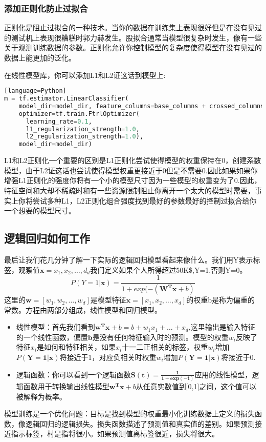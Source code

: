 \subsubsection{添加正则化防止过拟合}
正则化是阻止过拟合的一种技术。当你的数据在训练集上表现很好但是在没有见过的测试机上表现很糟糕时郭力赫发生。股拟合通常当模型很复杂时发生，像有一些关于观测训练数据的参数。正则化允许你控制模型的复杂度使得模型在没有见过的数据上能更加的泛化。

在线性模型库，你可以添加L1和L2证这话到模型上:
\begin{lstlisting}[language=Python][language=Python]
m = tf.estimator.LinearClassifier(
    model_dir=model_dir, feature_columns=base_columns + crossed_columns,
    optimizer=tf.train.FtrlOptimizer(
      learning_rate=0.1,
      l1_regularization_strength=1.0,
      l2_regularization_strength=1.0),
    model_dir=model_dir)
\end{lstlisting}
L1和L2正则化一个重要的区别是L1正则化尝试使得模型的权重保持在0，创建系数模型，由于L2证这话也尝试使得模型权重更接近于0但是不需要0.因此如果如果你增强L1正则化的强度你将有一个小的模型尺寸因为一些模型的权重变为了0.因此，特征空间和大却不稀疏时和有一些资源限制阻止你离开一个太大的模型时需要，事实上你将尝试多种L1，L2正则化组合强度找到最好的参数最好的控制过拟合给你一个想要的模型尺寸。
\subsection{逻辑回归如何工作}
最后让我们花几分钟了解一下实际的逻辑回归模型看起来像什么。我们用Y表示标签，观察值$\mathbf{x}={x_1,x_2,\ldots,d_d}$我们定义如果个人所得超过50K\$,Y=1,否则Y=0。
\begin{equation*}
P(Y=1|\mathbf{x})=\frac{1}{1+exp(-(\mathbf{W^Tx}+b)}
\end{equation*}
这里的$\mathbf{w}=[w_1,w_2,\ldots,w_d]$是模型特征$\mathbf{x}=[x_1,x_2,\ldots,x_d]$的权重b是称为偏重的常数。方程由两部分组成，线性模型和回归模型。
\begin{itemize}
  \item 线性模型：首先我们看到$\mathbf{w^Tx}+b=b+w_1x_1+\ldots+x_d$,这里输出是输入特征的一个线性函数，偏置$\mathbf{b}$是没有任何特征输入时的预测。模型的权重$w_i$反映了特征$x_i$是如何和特征相关，如果$x_i$十一二正相关的标签，权重$w_i$增加$P(\mathbf{Y=1|x})$将接近于1，对应负相关时权重$w_i$增加$P(\mathbf{Y=1|x})$将接近于0.
  \item 逻辑函数：你可以看到一个逻辑函数$\mathbf{S(t)=\frac{1}{1+exp(-t)}}$应用的线性模型，逻辑函数用于转换输出线性模型$\mathbf{w^Tx}+b$从任意实数值到[0,1]之间，这个值可以被解释为概率。
\end{itemize}
模型训练是一个优化问题：目标是找到模型的权重最小化训练数据上定义的损失函数，像逻辑回归的逻辑损失。损失函数描述了预测值和真实值的差别。如果预测接近指示标签，村是指将很小。如果预测值离标签很近，损失将很大。
